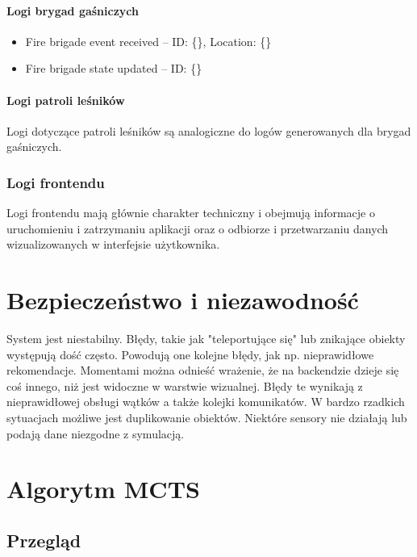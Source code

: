 \paragraph{Logi brygad gaśniczych}

\begin{itemize}
    \item Fire brigade event received -- ID: \{\}, Location: \{\}
    \item Fire brigade state updated -- ID: \{\}
\end{itemize}

\paragraph{Logi patroli leśników}

Logi dotyczące patroli leśników są analogiczne do logów generowanych dla brygad gaśniczych.

\subsubsection{Logi frontendu}

Logi frontendu mają głównie charakter techniczny i obejmują informacje o uruchomieniu i zatrzymaniu aplikacji oraz o odbiorze i przetwarzaniu danych wizualizowanych w interfejsie użytkownika.

\section{Bezpieczeństwo i niezawodność }
System jest niestabilny. Błędy, takie jak "teleportujące się" lub znikające obiekty występują dość często. Powodują one kolejne błędy, jak np. nieprawidłowe rekomendacje. Momentami można odnieść wrażenie, że na backendzie dzieje się coś innego, niż jest widoczne w warstwie wizualnej. Błędy te wynikają z nieprawidłowej obsługi wątków a także kolejki komunikatów. W bardzo rzadkich sytuacjach możliwe jest duplikowanie obiektów. Niektóre sensory nie działają lub podają dane niezgodne z symulacją. 

\section{Algorytm MCTS}

\subsection{Przegląd}

